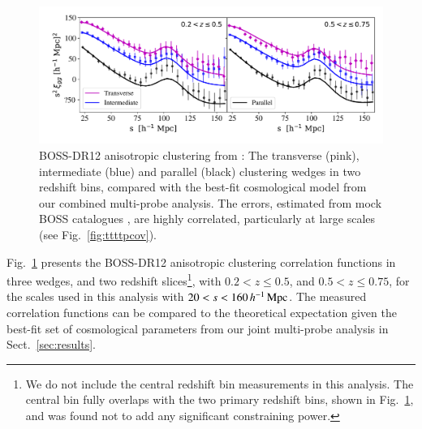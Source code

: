 \begin{figure}
        \includegraphics[width=\textwidth]{Data_Plots/clustering_wedges/BOSS_Sanchez_wedges.pdf}
        \caption{BOSS-DR12 anisotropic clustering from \citet{sanchez/etal:2017}:
          The transverse (pink), intermediate (blue) and parallel
          (black) clustering wedges in two redshift bins, compared 
          with the best-fit
          cosmological model from our combined multi-probe analysis.  The errors, estimated from mock BOSS catalogues \citep{kitaura/etal:2016}, are highly correlated, particularly at large scales (see Fig.~\ref{fig:ttttpcov}).}
        \label{fig:wedges}
\end{figure}

Fig.~\ref{fig:wedges} presents the \citet{sanchez/etal:2017} BOSS-DR12 anisotropic clustering correlation functions in three wedges, and two redshift slices\footnote{We do not include the \citet{sanchez/etal:2017} central redshift bin measurements in this analysis.  The central bin fully overlaps with the two primary redshift bins, shown in Fig.~\ref{fig:wedges}, and was found not to add any significant constraining power.}, with $0.2<z\leq0.5$, and $0.5<z\leq0.75$, for the scales used in this analysis with $20  < s < 160\, h^{-1}\, {\rm Mpc}$.   The measured correlation functions can be compared to the theoretical expectation given the best-fit set of cosmological parameters from our joint multi-probe analysis in Sect.~\ref{sec:results}.

